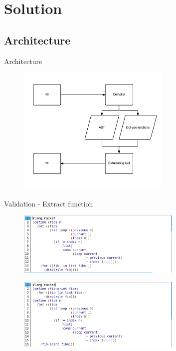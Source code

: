 \documentclass[xcolor=dvipsnames]{beamer}
\begin{document}
\section{Solution}
\subsection{Architecture}
\begin{frame}{Architecture}
\begin{figure}[htbp]
  \centering
  \includegraphics[width=0.65\textwidth]{img/arquitectura.png}
  \label{fig:label}
\end{figure}
\end{frame}
\begin{frame}{Validation - Extract function}
\begin{figure}[htbp]
  \centering
  \includegraphics[width=0.7\textwidth]{img/fibonacci.png}
  \label{fig:fib-extract}
\end{figure}

\begin{figure}[htbp]
  \centering
  \includegraphics[width=0.7\textwidth]{img/fibonacci-extracted-lprint.png}
  \label{fig:fib-extract-one}
\end{figure}
\end{frame}
\end{document}

